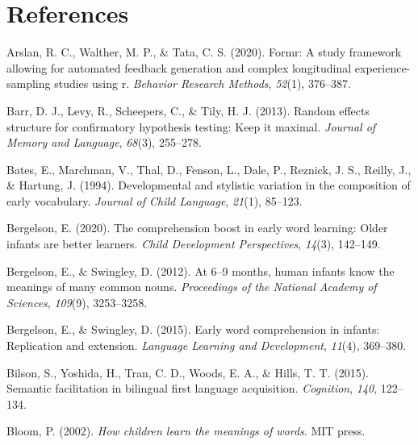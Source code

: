 \documentclass[
  letterpaper,
  DIV=11,
  numbers=noendperiod]{scrartcl}
\newlength{\cslhangindent}
\newlength{\cslentryspacingunit} %
\newenvironment{CSLReferences}[2] %
 {%
  \setlength{\parindent}{0pt}
  \ifodd #1
  \let\oldpar\par
  \def\par{\hangindent=\cslhangindent\oldpar}
  \fi
  \setlength{\parskip}{#2\cslentryspacingunit}
 }%
 {}
\begin{document}
\hypertarget{sec-references}{%
\section{References}\label{sec-references}}

\hypertarget{refs}{}
\begin{CSLReferences}{1}{0}
\leavevmode{}%
Arslan, R. C., Walther, M. P., \& Tata, C. S. (2020). Formr: A study
framework allowing for automated feedback generation and complex
longitudinal experience-sampling studies using r. \emph{Behavior
Research Methods}, \emph{52}(1), 376--387.

\leavevmode{}%
Barr, D. J., Levy, R., Scheepers, C., \& Tily, H. J. (2013). Random
effects structure for confirmatory hypothesis testing: Keep it maximal.
\emph{Journal of Memory and Language}, \emph{68}(3), 255--278.

\leavevmode{}%
Bates, E., Marchman, V., Thal, D., Fenson, L., Dale, P., Reznick, J. S.,
Reilly, J., \& Hartung, J. (1994). Developmental and stylistic variation
in the composition of early vocabulary. \emph{Journal of Child
Language}, \emph{21}(1), 85--123.

\leavevmode{}%
Bergelson, E. (2020). The comprehension boost in early word learning:
Older infants are better learners. \emph{Child Development
Perspectives}, \emph{14}(3), 142--149.

\leavevmode{}%
Bergelson, E., \& Swingley, D. (2012). At 6--9 months, human infants
know the meanings of many common nouns. \emph{Proceedings of the
National Academy of Sciences}, \emph{109}(9), 3253--3258.

\leavevmode{}%
Bergelson, E., \& Swingley, D. (2015). Early word comprehension in
infants: Replication and extension. \emph{Language Learning and
Development}, \emph{11}(4), 369--380.

\leavevmode{}%
Bilson, S., Yoshida, H., Tran, C. D., Woods, E. A., \& Hills, T. T.
(2015). Semantic facilitation in bilingual first language acquisition.
\emph{Cognition}, \emph{140}, 122--134.

\leavevmode{}%
Bloom, P. (2002). \emph{How children learn the meanings of words}. MIT
press.


\end{CSLReferences}
\end{document}
